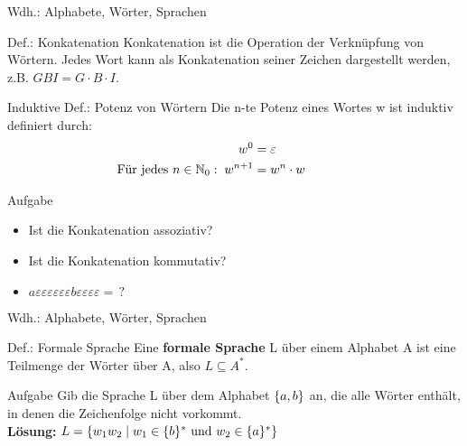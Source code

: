 \begin{frame}{Wdh.: Alphabete, Wörter, Sprachen}
	\begin{block}{Def.: Konkatenation}
		Konkatenation ist die Operation der Verknüpfung von Wörtern. Jedes Wort kann als Konkatenation seiner Zeichen dargestellt werden, z.B. \(GBI = G \cdot B \cdot I\).
	\end{block}
	\pause
	\begin{block}{Induktive Def.: Potenz von Wörtern}
		Die n-te Potenz eines Wortes w ist induktiv definiert durch:
		\begin{align*}
				w^{0} &= \varepsilon \hphantom{000000000000}\\
				\text{Für jedes } n \in \mathbb{N}_{0}: \; w^{n+1} & = w^{n} \cdot w
		\end{align*}
	\end{block}
	\pause
	\begin{exampleblock}{Aufgabe}
	\begin{itemize}
		\item Ist die Konkatenation assoziativ?\pause
		\item Ist die Konkatenation kommutativ?\pause
		\item \(a\varepsilon\varepsilon\varepsilon\varepsilon\varepsilon\varepsilon b\varepsilon\varepsilon\varepsilon\varepsilon = \, ?\)
	\end{itemize}		
	\end{exampleblock}
\end{frame}

\begin{frame}{Wdh.: Alphabete, Wörter, Sprachen}
	\begin{block}{Def.: Formale Sprache}
		Eine \textbf{formale Sprache} L über einem Alphabet A ist eine Teilmenge der Wörter über A, also \(L \subseteq A^{*}\).
	\end{block}

	\begin{exampleblock}{Aufgabe}
		Gib die Sprache L über dem Alphabet \(\{ a,b \}\) an, die alle Wörter enthält, in denen die Zeichenfolge  nicht vorkommt.\\
		\pause
		\textbf{Lösung:} \(L = \{ w_{1}w_{2} \mid w_{1} \in \{ b \}^{*} \text{ und } w_{2} \in \{ a \}^{*} \}\)
	\end{exampleblock}
\end{frame}

\section{}
\questionframe
\lastframe
